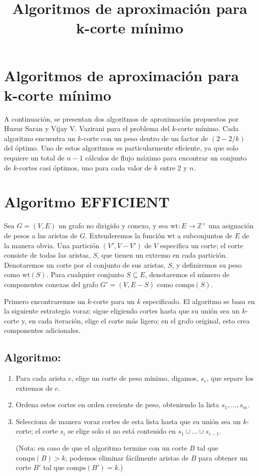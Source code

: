 \documentclass{article}
\title{Algoritmos de aproximación para k-corte mínimo}
\begin{document}
\maketitle

\section{Algoritmos de aproximación para k-corte mínimo}
A continuación, se presentan dos algoritmos de aproximación propuestos por Huzur Saran y Vijay V. Vazirani \cite{HV} para el problema del \( k \)-corte mínimo. Cada algoritmo encuentra un \( k \)-corte con un peso dentro de un factor de \( (2 - 2/k) \) del óptimo. Uno de estos algoritmos es particularmente eficiente, ya que solo requiere un total de \( n - 1 \) cálculos de flujo máximo para encontrar un conjunto de \( k \)-cortes casi óptimos, uno para cada valor de \( k \) entre 2 y \( n \).

\section{Algoritmo EFFICIENT}

Sea $G = (V, E)$ un grafo no dirigido y conexo, y sea $\text{wt}: E \to \mathbb{Z}^+$ una asignación de pesos a las aristas de $G$. Extenderemos la función $\text{wt}$ a subconjuntos de $E$ de la manera obvia. Una partición $(V', V - V')$ de $V$ especifica un corte; el corte consiste de todas las aristas, $S$, que tienen un extremo en cada partición. Denotaremos un corte por el conjunto de sus aristas, $S$, y definiremos su peso como $\text{wt}(S)$. Para cualquier conjunto $S \subseteq E$, denotaremos el número de componentes conexas del grafo $G' = (V, E - S)$ como $\text{comps}(S)$.

Primero encontraremos un $k$-corte para un $k$ especificado. El algoritmo se basa en la siguiente estrategia voraz: sigue eligiendo cortes hasta que su unión sea un $k$-corte y, en cada iteración, elige el corte más ligero; en el grafo original, esto crea componentes adicionales.

\subsection*{Algoritmo:}

\begin{enumerate}
    \item Para cada arista $e$, elige un corte de peso mínimo, digamos, $s_e$, que separe los extremos de $e$.
    \item Ordena estos cortes en orden creciente de peso, obteniendo la lista $s_1, \dots, s_m$.
    \item Selecciona de manera voraz cortes de esta lista hasta que su unión sea un $k$-corte; el corte $s_i$ se elige solo si no está contenido en $s_1 \cup \dots \cup s_{i-1}$.
    
    (Nota: en caso de que el algoritmo termine con un corte $B$ tal que $\text{comps}(B) > k$, podemos eliminar fácilmente aristas de $B$ para obtener un corte $B'$ tal que $\text{comps}(B') = k$.)
\end{enumerate}
\end{document}
